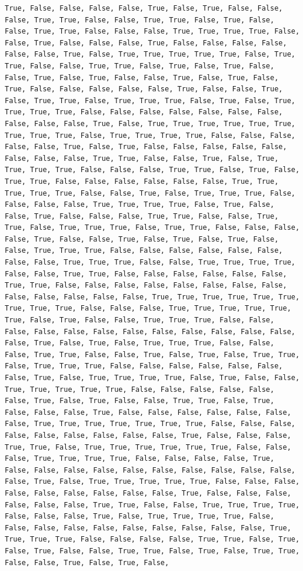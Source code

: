 \documentclass[
  letterpaper,
  DIV=11,
  numbers=noendperiod]{scrartcl}
\begin{document}
\begin{verbatim}
True, False, False, False, False, True, False, True, False, False, False, True, True, False, False, True, True, False, True, False, False, True, True, False, False, False, True, True, True, True, False, False, True, False, False, False, True, False, False, False, False, False, False, True, False, True, True, True, True, True, False, True, True, False, False, True, True, False, True, False, True, False, False, True, False, True, False, False, True, False, True, False, True, False, False, False, False, False, True, False, False, True, False, True, True, False, True, True, True, False, True, False, True, True, True, True, False, False, False, False, False, False, False, False, False, False, True, False, True, True, True, True, True, True, True, True, True, False, True, True, True, True, False, False, False, False, False, True, False, True, False, False, False, False, False, False, False, False, True, True, False, False, True, False, True, True, True, True, False, False, False, True, True, False, True, False, True, True, False, False, False, False, False, False, True, True, True, True, True, False, False, True, False, True, True, True, False, False, False, False, True, True, True, True, False, True, False, False, True, False, False, False, True, True, False, False, True, True, False, True, True, True, False, True, True, False, False, False, False, True, False, False, True, False, True, False, True, False, False, True, True, True, False, False, False, False, False, False, False, False, True, True, True, False, False, True, True, True, True, False, False, True, True, False, False, False, False, False, False, True, True, False, False, False, False, False, False, False, False, False, False, False, False, False, True, True, True, True, True, True, True, True, True, False, False, False, True, True, True, True, True, True, False, True, False, False, True, True, True, False, False, False, False, False, False, False, False, False, False, False, False, False, True, False, True, False, True, True, True, False, False, False, True, True, False, False, True, False, True, False, True, True, False, True, True, True, False, False, False, False, False, False, False, True, False, True, True, True, True, False, True, False, False, True, True, True, True, True, False, False, False, False, False, False, True, False, True, False, False, True, True, False, True, False, False, False, True, False, False, False, False, False, False, False, True, True, True, True, True, True, True, False, False, False, False, False, False, False, False, False, True, False, False, False, True, True, False, True, True, True, True, True, True, False, False, False, True, True, True, True, False, False, False, False, True, False, False, False, False, False, False, False, False, False, False, False, True, False, True, True, True, True, True, False, False, False, False, False, False, False, False, False, True, False, False, False, False, False, False, True, True, False, False, True, True, True, True, False, False, False, True, False, True, True, True, True, False, False, False, False, False, False, False, False, False, False, True, True, True, True, False, False, False, False, True, True, False, True, False, True, False, False, True, True, False, True, False, True, True, False, False, True, False, True, False, 
\end{verbatim}
\end{document}
